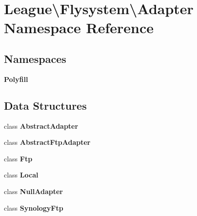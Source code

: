\section{League\textbackslash{}Flysystem\textbackslash{}Adapter Namespace Reference}
\label{namespace_league_1_1_flysystem_1_1_adapter}
\subsection*{Namespaces}
\begin{DoxyCompactItemize}
\item 
 {\bf Polyfill}
\end{DoxyCompactItemize}
\subsection*{Data Structures}
\begin{DoxyCompactItemize}
\item 
class {\bf Abstract\+Adapter}
\item 
class {\bf Abstract\+Ftp\+Adapter}
\item 
class {\bf Ftp}
\item 
class {\bf Local}
\item 
class {\bf Null\+Adapter}
\item 
class {\bf Synology\+Ftp}
\end{DoxyCompactItemize}
